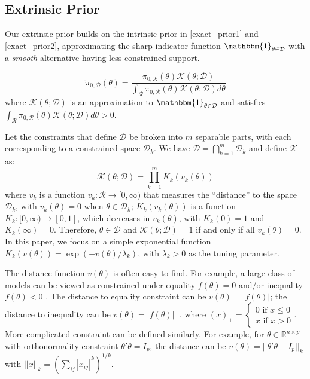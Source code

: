 \documentclass[10pt]{article}
\newcommand{\mc}[1]{\mathcal{#1}}
\DeclareMathOperator{\1}{\mathbbm{1}}
\begin{document}
\subsection{Extrinsic Prior}
Our extrinsic prior builds on the intrinsic prior in \eqref{exact_prior1} and \eqref{exact_prior2}, approximating the sharp indicator function
$\mathbbm{1}_{\theta\in \mc D}$ with a {\em smooth} alternative having less constrained support.

\begin{equation}
\label{extrinsic_prior}
	\tilde{\pi}_{0,\mc D}(\theta) = \frac{ \pi_{0,\mc R}(\theta) \mc{K}( \theta; \mc D) }{ \int_{\mc R} \pi_{0,\mc R}(\theta) \mc{K}(\theta; \mc D)d\theta }
\end{equation}
where $\mc K(\theta; \mc D)$ is an approximation to $\mathbbm{1}_{\theta\in \mc D}$ and satisfies  $ \int_{\mc R} \pi_{0,\mc R}(\theta) \mc{K}(\theta; \mc D)d\theta>0$.

Let the constraints that define $\mc D$ be broken into $m$ separable parts, with each corresponding to a constrained space $\mc D_k$. We have $\mc D = \bigcap_{k=1}^m\mc D_k$ and define $\mc K$ as:
\begin{equation}
\label{smoothing}
\mc K(\theta; \mc D)= \prod_{k=1}^m K_k(v_k(\theta))
\end{equation}
where $v_k$ is a function $v_k: \mc R \rightarrow [0,\infty)$ that measures the ``distance'' to the space $\mc D_k$, with $v_k(\theta)=0$ when $\theta\in \mc D_k$; $K_k(v_k(\theta))$ is a function $K_k:[0,\infty)\rightarrow [0,1]$, which decreases in $v_k(\theta)$, with $K_k(0)=1$ and $K_k(\infty)=0$. Therefore,  $\theta\in \mc D$ and $\mc K(\theta;\mc D)=1$ if and only if all $v_k(\theta)=0$. In this paper, we focus on a simple exponential function $K_k(v(\theta)) = \exp(-v(\theta)/\lambda_k)$, with $\lambda_k>0$ as the tuning parameter.

The distance function $v(\theta)$ is often easy to find. For example, a large class of models can be viewed as constrained under  equality $f(\theta)=0$ and/or inequality $f(\theta)<0$ . The distance to equality constraint can be $v(\theta)=|f(\theta)|$; the distance to inequality can be $v(\theta)=|f(\theta)|_+$, where $(x)_+ = \left\{\begin{array}{cc}  0 \text{ if } x\le 0 \\ x \text{ if } x> 0\end{array}\right.$. More complicated constraint can be defined similarly. For example, for $\theta\in \mathbb{R}^{n\times p}$ with orthonormality constraint $\theta'\theta=I_p$, the distance can be $v(\theta) = ||\theta'\theta-I_p||_{k}$ with $||x||_k=(\sum_{ij} |x_{ij}|^k)^{1/k}$.
\end{document}
